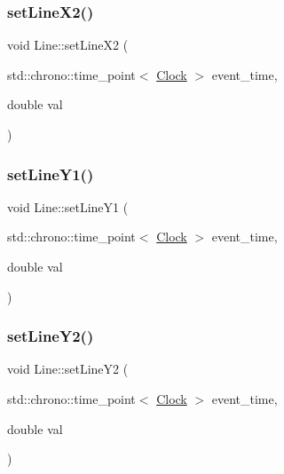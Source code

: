 \mbox{\label{classLine_ade959bc4d4f69bb421ed4f69c0d77fb7}} 
\subsubsection{\texorpdfstring{set\+Line\+X2()}{setLineX2()}}
{\footnotesize\ttfamily void Line\+::set\+Line\+X2 (\begin{DoxyParamCaption}\item[{std\+::chrono\+::time\+\_\+point$<$ \mbox{\hyperlink{universe_8h_a0ef8d951d1ca5ab3cfaf7ab4c7a6fd80}{Clock}} $>$}]{event\+\_\+time,  }\item[{double}]{val }\end{DoxyParamCaption})\hspace{0.3cm}{\ttfamily [inline]}}

\mbox{\label{classLine_af236c5ddb0d125b388621b3597266a95}} 
\subsubsection{\texorpdfstring{set\+Line\+Y1()}{setLineY1()}}
{\footnotesize\ttfamily void Line\+::set\+Line\+Y1 (\begin{DoxyParamCaption}\item[{std\+::chrono\+::time\+\_\+point$<$ \mbox{\hyperlink{universe_8h_a0ef8d951d1ca5ab3cfaf7ab4c7a6fd80}{Clock}} $>$}]{event\+\_\+time,  }\item[{double}]{val }\end{DoxyParamCaption})\hspace{0.3cm}{\ttfamily [inline]}}

\mbox{\label{classLine_a671f64c437fe1bef798476d93c675099}} 
\subsubsection{\texorpdfstring{set\+Line\+Y2()}{setLineY2()}}
{\footnotesize\ttfamily void Line\+::set\+Line\+Y2 (\begin{DoxyParamCaption}\item[{std\+::chrono\+::time\+\_\+point$<$ \mbox{\hyperlink{universe_8h_a0ef8d951d1ca5ab3cfaf7ab4c7a6fd80}{Clock}} $>$}]{event\+\_\+time,  }\item[{double}]{val }\end{DoxyParamCaption})\hspace{0.3cm}{\ttfamily [inline]}}

